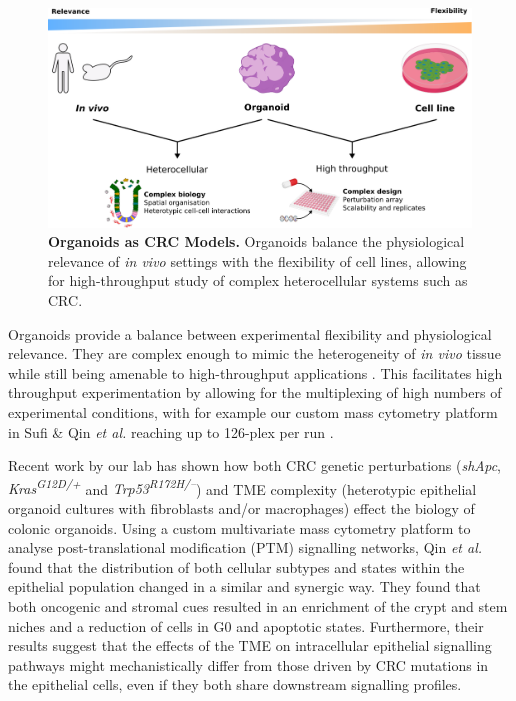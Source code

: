 \begin{figure}[H]
    \centering
    \includegraphics{01intro/figs/1BIO_organoids.png}
    \caption{\textbf{Organoids as CRC Models.} Organoids balance the physiological relevance of \emph{in vivo} settings with the flexibility of cell lines, allowing for high-throughput study of complex heterocellular systems such as CRC.}
    \label{fig:1org}
\end{figure}

Organoids provide a balance between experimental flexibility and physiological relevance. They are complex enough to mimic the heterogeneity of \emph{in vivo} tissue while still being amenable to high-throughput applications \cite{qin_deciphering_2020}. This facilitates high throughput experimentation by allowing for the multiplexing of high numbers of experimental conditions, with for example our custom mass cytometry platform in Sufi \& Qin \emph{et al.} reaching up to 126-plex per run \cite{sufi_multiplexed_2021}.

Recent work by our lab \cite{qin_cell-type-specific_2020} has shown how both CRC genetic perturbations (\textit{shApc}, \textit{Kras\textsuperscript{G12D/+}} and \textit{Trp53\textsuperscript{R172H/–}}) and TME complexity (heterotypic epithelial organoid cultures with fibroblasts and/or macrophages) effect the biology of colonic organoids. Using a custom multivariate mass cytometry platform to analyse post-translational modification (PTM) signalling networks, Qin \emph{et al.}~\cite{qin_cell-type-specific_2020} found that the distribution of both cellular subtypes and states within the epithelial population changed in a similar and synergic way. They found that both oncogenic and stromal cues resulted in an enrichment of the crypt and stem niches and a reduction of cells in G0 and apoptotic states. Furthermore, their results suggest that the effects of the TME on intracellular epithelial signalling pathways might mechanistically differ from those driven by CRC mutations in the epithelial cells, even if they both share downstream signalling profiles.

